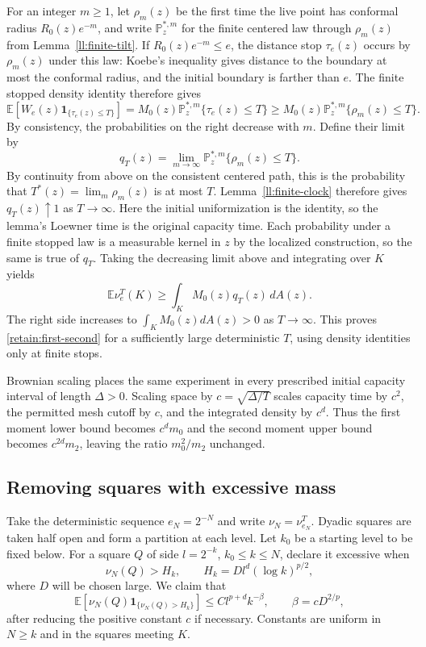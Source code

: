 For an integer $m\ge1$, let $\rho_m(z)$ be the first time the live
point has conformal radius $R_0(z)e^{-m}$, and write $\mathbb P_z^{*,m}$ for
the finite centered law through $\rho_m(z)$ from
Lemma~\ref{ll:finite-tilt}.  If $R_0(z)e^{-m}\le e$, the distance stop
$\tau_e(z)$ occurs by $\rho_m(z)$ under this law: Koebe's inequality
gives distance to the boundary at most the conformal radius, and the
initial boundary is farther than $e$.  The finite stopped density
identity therefore gives
\[
 \mathbb E\!\left[W_e(z)\mathbf1_{\{\tau_e(z)\le T\}}\right]
 =M_0(z)\mathbb P_z^{*,m}\{\tau_e(z)\le T\}
 \ge M_0(z)\mathbb P_z^{*,m}\{\rho_m(z)\le T\}.
\]
By consistency, the probabilities on the right decrease with $m$.
Define their limit by
\[
 q_T(z)=\lim_{m\to\infty}
       \mathbb P_z^{*,m}\{\rho_m(z)\le T\}.
\]
By continuity from above on the consistent centered path, this is
the probability that $T^*(z)=\lim_m\rho_m(z)$ is at most $T$.
Lemma~\ref{ll:finite-clock} therefore gives $q_T(z)\uparrow1$ as
$T\to\infty$.  Here the initial uniformization is the identity, so
the lemma's Loewner time is the original capacity time.
Each probability under a finite stopped law is a
measurable kernel in $z$ by the localized construction, so the same
is true of $q_T$.  Taking the decreasing
limit above and integrating over $K$ yields
\[
 \mathbb E\nu_e^T(K)\ge\int_K M_0(z)q_T(z)\,dA(z).
\]
The right side increases to $\int_KM_0(z)dA(z)>0$ as $T\to\infty$.
This proves \eqref{retain:first-second} for a sufficiently large
deterministic $T$, using density identities only at finite stops.

Brownian scaling places the same experiment in every prescribed
initial capacity interval of length $\Delta>0$.  Scaling space by
$c=\sqrt{\Delta/T}$ scales capacity time by $c^2$, the permitted mesh
cutoff by $c$, and the integrated density by $c^d$.  Thus the first
moment lower bound becomes $c^dm_0$ and the second moment upper bound
becomes $c^{2d}m_2$, leaving the ratio $m_0^2/m_2$ unchanged.

\subsection{Removing squares with excessive mass}

Take the deterministic sequence $e_N=2^{-N}$ and write
$\nu_N=\nu_{e_N}^T$.  Dyadic squares are taken half open and form a
partition at each level.  Let $k_0$ be a starting level to be fixed below.  For a
square $Q$ of side $l=2^{-k}$, $k_0\le k\le N$, declare it excessive
when
\[
 \nu_N(Q)>H_k,
 \qquad H_k=D l^d(\log k)^{p/2},
\]
where $D$ will be chosen large.  We claim that
\begin{equation}
 \mathbb E\left[\nu_N(Q)\mathbf1_{\{\nu_N(Q)>H_k\}}\right]
 \le C l^{p+d}k^{-\beta},
 \qquad \beta=cD^{2/p},
 \label{retain:bad-square}
\end{equation}
after reducing the positive constant $c$ if necessary.  Constants
are uniform in $N\ge k$ and in the squares meeting $K$.

